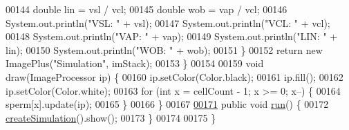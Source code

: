 \begin{DoxyCode}
00144       \textcolor{keywordtype}{double} lin = vsl / vcl;
00145       \textcolor{keywordtype}{double} wob = vap / vcl;
00146       System.out.println(\textcolor{stringliteral}{"VSL: "} + vsl);
00147       System.out.println(\textcolor{stringliteral}{"VCL: "} + vcl);
00148       System.out.println(\textcolor{stringliteral}{"VAP: "} + vap);
00149       System.out.println(\textcolor{stringliteral}{"LIN: "} + lin);
00150       System.out.println(\textcolor{stringliteral}{"WOB: "} + wob);
00151     \}
00152     \textcolor{keywordflow}{return} \textcolor{keyword}{new} ImagePlus(\textcolor{stringliteral}{"Simulation"}, imStack);
00153   \}
00154 
00159   \textcolor{keywordtype}{void} draw(ImageProcessor ip) \{
00160     ip.setColor(Color.black);
00161     ip.fill();
00162     ip.setColor(Color.white);
00163     \textcolor{keywordflow}{for} (\textcolor{keywordtype}{int} x = cellCount - 1; x >= 0; x--) \{
00164       sperm[x].update(ip);
00165     \}
00166   \}
00167 
\hypertarget{_oscillatory_walker_8java_source_l00171}{}\hyperlink{classdata_1_1_oscillatory_walker_a13a43e6d814de94978c515cb084873b1}{00171}   \textcolor{keyword}{public} \textcolor{keywordtype}{void} \hyperlink{classdata_1_1_oscillatory_walker_a13a43e6d814de94978c515cb084873b1}{run}() \{
00172     \hyperlink{classdata_1_1_oscillatory_walker_ad015489397f3b1157e02d08913211ee4}{createSimulation}().show();
00173   \}
00174 
00175 \}
\end{DoxyCode}
